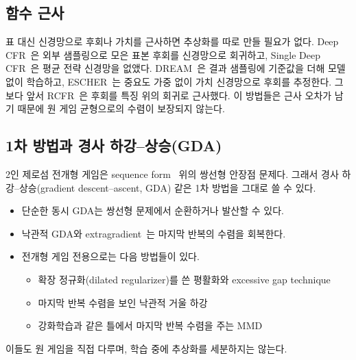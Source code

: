 \subsection{함수 근사}
표 대신 신경망으로 후회나 가치를 근사하면 추상화를 따로 만들 필요가 없다.
Deep CFR~\citep{brown2019deep}은 외부 샘플링으로 모은 표본 후회를 신경망으로 회귀하고, Single Deep CFR~\citep{steinberger2019single}은 평균 전략 신경망을 없앴다.
DREAM~\citep{steinberger2020dream}은 결과 샘플링에 기준값을 더해 모델 없이 학습하고, ESCHER~\citep{mcaleer2023escher}는 중요도 가중 없이 가치 신경망으로 후회를 추정한다.
그보다 앞서 RCFR~\citep{waugh2015solving}은 후회를 특징 위의 회귀로 근사했다.
이 방법들은 근사 오차가 남기 때문에 원 게임 균형으로의 수렴이 보장되지 않는다.

\subsection{1차 방법과 경사 하강–상승(GDA)}
2인 제로섬 전개형 게임은 sequence form~\citep{vonstengel1996efficient} 위의 쌍선형 안장점 문제다.
그래서 경사 하강–상승(gradient descent–ascent, GDA) 같은 1차 방법을 그대로 쓸 수 있다.
\begin{itemize}
  \item 단순한 동시 GDA는 쌍선형 문제에서 순환하거나 발산할 수 있다.
  \item 낙관적 GDA와 extragradient~\citep{daskalakis2018training,mertikopoulos2019optimistic}는 마지막 반복의 수렴을 회복한다.
  \item 전개형 게임 전용으로는 다음 방법들이 있다.
    \begin{itemize}
      \item 확장 정규화(dilated regularizer)를 쓴 평활화와 excessive gap technique~\citep{hoda2010smoothing,kroer2020faster}
      \item 마지막 반복 수렴을 보인 낙관적 거울 하강~\citep{lee2021last}
      \item 강화학습과 같은 틀에서 마지막 반복 수렴을 주는 MMD~\citep{sokota2023unified}
    \end{itemize}
\end{itemize}
이들도 원 게임을 직접 다루며, 학습 중에 추상화를 세분하지는 않는다.

